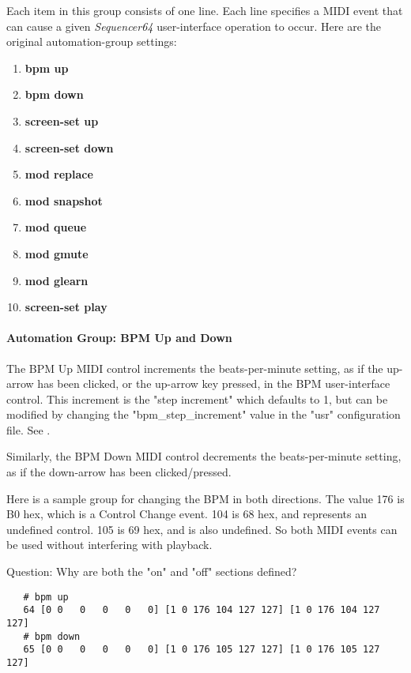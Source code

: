    Each item in this group consists of one line.  Each line
   specifies a MIDI event that can cause a given
   \textsl{Sequencer64} user-interface operation to occur.
   Here are the original automation-group settings:

   \begin{enumerate}
      \item \textbf{bpm up}
      \item \textbf{bpm down}
      \item \textbf{screen-set up}
      \item \textbf{screen-set down}
      \item \textbf{mod replace}
      \item \textbf{mod snapshot}
      \item \textbf{mod queue}
      \item \textbf{mod gmute}
      \item \textbf{mod glearn}
      \item \textbf{screen-set play}
   \end{enumerate}

\paragraph{Automation Group: BPM Up and Down}
\label{paragraph:seq64_rc_file_midi_ctrl_bpmupdn}

   The BPM Up MIDI control increments the beats-per-minute setting, as if
   the up-arrow has been clicked, or the up-arrow key pressed, in
   the BPM user-interface control.
   This increment is the
   "step increment" which defaults to 1, but can be modified by
   changing the "bpm\_step\_increment" value in the "usr"
   configuration file.
   See .

   Similarly, the BPM Down MIDI control decrements the beats-per-minute
   setting, as if the down-arrow has been clicked/pressed.

   Here is a sample group for changing the BPM in both directions.  The value
   176 is B0 hex, which is a Control Change event.  104 is 68 hex, and
   represents an undefined control.  105 is 69 hex, and is also undefined. So
   both MIDI events can be used without interfering with playback.

   Question: Why are both the "on" and "off" sections defined?

   \begin{verbatim}
   # bpm up
   64 [0 0   0   0   0   0] [1 0 176 104 127 127] [1 0 176 104 127 127]
   # bpm down
   65 [0 0   0   0   0   0] [1 0 176 105 127 127] [1 0 176 105 127 127]
   \end{verbatim}

